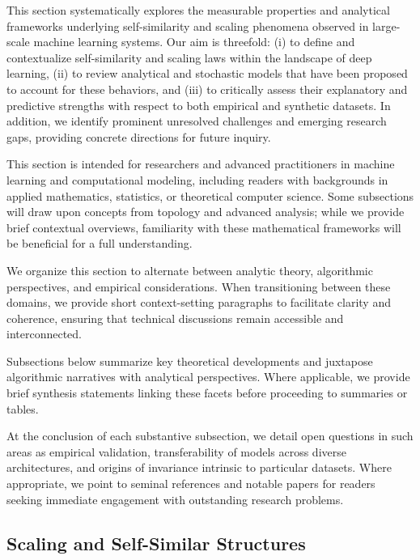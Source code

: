 \documentclass[sigconf]{acmart}
\begin{document}
This section systematically explores the measurable properties and analytical frameworks underlying self-similarity and scaling phenomena observed in large-scale machine learning systems. Our aim is threefold: (i) to define and contextualize self-similarity and scaling laws within the landscape of deep learning, (ii) to review analytical and stochastic models that have been proposed to account for these behaviors, and (iii) to critically assess their explanatory and predictive strengths with respect to both empirical and synthetic datasets. In addition, we identify prominent unresolved challenges and emerging research gaps, providing concrete directions for future inquiry.

This section is intended for researchers and advanced practitioners in machine learning and computational modeling, including readers with backgrounds in applied mathematics, statistics, or theoretical computer science. Some subsections will draw upon concepts from topology and advanced analysis; while we provide brief contextual overviews, familiarity with these mathematical frameworks will be beneficial for a full understanding.

We organize this section to alternate between analytic theory, algorithmic perspectives, and empirical considerations. When transitioning between these domains, we provide short context-setting paragraphs to facilitate clarity and coherence, ensuring that technical discussions remain accessible and interconnected.

Subsections below summarize key theoretical developments and juxtapose algorithmic narratives with analytical perspectives. Where applicable, we provide brief synthesis statements linking these facets before proceeding to summaries or tables.

At the conclusion of each substantive subsection, we detail open questions in such areas as empirical validation, transferability of models across diverse architectures, and origins of invariance intrinsic to particular datasets. Where appropriate, we point to seminal references and notable papers for readers seeking immediate engagement with outstanding research problems.


\subsection{Scaling and Self-Similar Structures}
\end{document}
